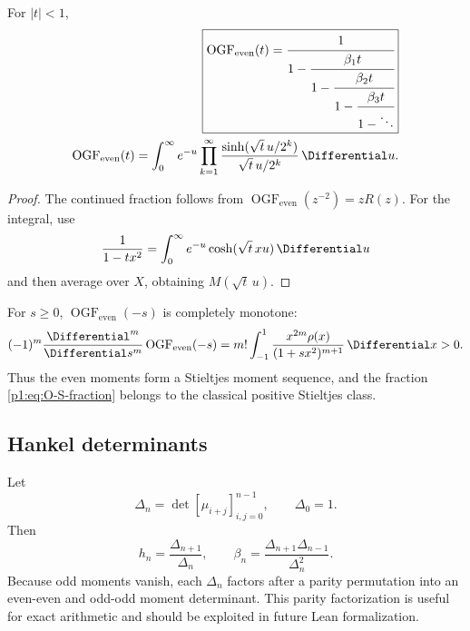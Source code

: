 \documentclass[11pt]{article}
\theoremstyle{definition}
\theoremstyle{remark}
\newcommand{\EvenMomentOrdinaryGeneratingFunction}{\operatorname{OGF}_{\mathrm{even}}}
\begin{document}
\begin{corollary}\label{p1:cor:S-fraction}
For \(|t|<1\),
\begin{align}
 \boxed{
 \EvenMomentOrdinaryGeneratingFunction(t)=\cfrac{1}{1-\cfrac{\beta_1t}{1-\cfrac{\beta_2t}{1-
               \cfrac{\beta_3t}{1-\ddots}}}}
 }                                                           \label{p1:eq:O-S-fraction}\\
 \EvenMomentOrdinaryGeneratingFunction(t)=\int_0^{\infty}e^{-u}
 \prod_{k=1}^{\infty}
 \frac{\sinh(\sqrt t\,u/2^k)}{\sqrt t\,u/2^k}\,\Differential u.    \label{p1:eq:O-product-integral}
\end{align}
\end{corollary}

\begin{proof}
The continued fraction follows from
\(\EvenMomentOrdinaryGeneratingFunction(z^{-2})=zR(z)\).  For the integral, use
\[
 \frac1{1-tx^2}=\int_0^{\infty}e^{-u}\cosh(\sqrt t\,xu)\,\Differential u
\]
and then average over \(X\), obtaining \(M(\sqrt t\,u)\).
\end{proof}

For \(s\ge0\), \(\EvenMomentOrdinaryGeneratingFunction(-s)\) is completely monotone:
\begin{equation}
 (-1)^m\frac{\Differential^m}{\Differential s^m}
 \EvenMomentOrdinaryGeneratingFunction(-s)
 =m!\int_{-1}^{1}\frac{x^{2m}\rho(x)}{(1+sx^2)^{m+1}}\,\Differential x>0. \label{p1:eq:O-complete-monotone}
\end{equation}
Thus the even moments form a Stieltjes moment sequence, and the fraction
\eqref{p1:eq:O-S-fraction} belongs to the classical positive Stieltjes class.

\subsection{Hankel determinants}

Let
\begin{equation}
 \Delta_n=\det[\mu_{i+j}]_{i,j=0}^{n-1},\qquad \Delta_0=1.  \label{p1:eq:Hankel}
\end{equation}
Then
\begin{equation}
 h_n=\frac{\Delta_{n+1}}{\Delta_n},
 \qquad
 \boxed{\beta_n=\frac{\Delta_{n+1}\Delta_{n-1}}{\Delta_n^2}}. \label{p1:eq:beta-Hankel}
\end{equation}
Because odd moments vanish, each \(\Delta_n\) factors after a parity permutation into an
even-even and odd-odd moment determinant.  This parity factorization is useful for exact
arithmetic and should be exploited in future Lean formalization.
\end{document}
